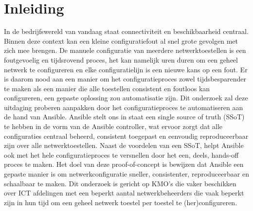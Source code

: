 


% 

\section{Inleiding}%
\label{sec:inleiding}

In de bedrijfswereld van vandaag staat connectiviteit en beschikbaarheid centraal. Binnen deze context kan een kleine configuratiefout al snel grote gevolgen met zich mee brengen. De manuele configuratie van meerdere netwerktoestellen is een foutgevoelig en tijdsrovend proces, het kan namelijk uren duren om een geheel netwerk te configureren en elke configuratielijn is een nieuwe kans op een fout.
Er is daarom nood aan een manier om het configuratieproces zowel tijdsbesparender te maken als een manier die alle toestellen consistent en foutloos kan configureren, een gepaste oplossing zou automatisatie zijn.
Dit onderzoek zal deze uitdaging proberen aanpakken door het configuratieproces te automatiseren aan de hand van Ansible. Ansible stelt ons in staat een single source of truth (SSoT) te hebben in de vorm van de Ansible controller, wat ervoor zorgt dat alle configuraties centraal beheerd, consistent toegepast en eenvoudig reproduceerbaar zijn over alle netwerktoestellen.
Naast de voordelen van een SSoT, helpt Ansible ook met het hele configuratieproces te versnellen door het een, deels, hands-off proces te maken.
Het doel van deze proof-of-concept is bewijzen dat Ansible een gepaste manier is om netwerkconfiguratie sneller, consistenter, reproduceerbaar en schaalbaar te maken.
Dit onderzoek is gericht op KMO's die vaker beschikken over ICT afdelingen met een beperkt aantal netwerkbeheerders die vaak beperkt zijn in hun tijd om een geheel netwerk toestel per toestel te (her)configureren.

